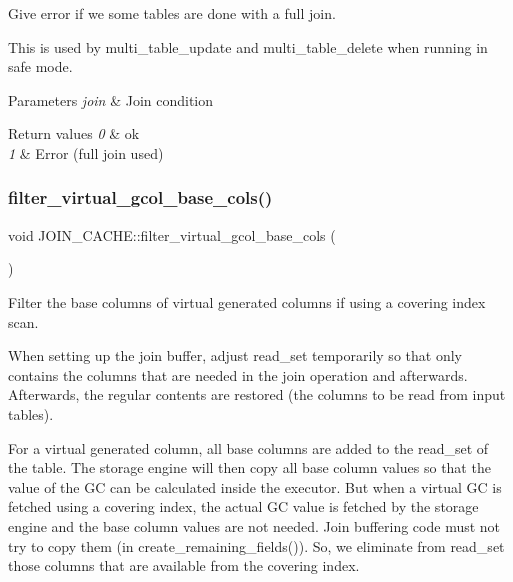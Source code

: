 Give error if we some tables are done with a full join.

This is used by multi\+\_\+table\+\_\+update and multi\+\_\+table\+\_\+delete when running in safe mode.


\begin{DoxyParams}{Parameters}
{\em join} & Join condition\\
\hline
\end{DoxyParams}

\begin{DoxyRetVals}{Return values}
{\em 0} & ok \\
\hline
{\em 1} & Error (full join used) \\
\hline
\end{DoxyRetVals}
\mbox{\label{group__Query__Optimizer_gaae89dde6a1925032ade263c27a87529f}} 
\subsubsection{\texorpdfstring{filter\+\_\+virtual\+\_\+gcol\+\_\+base\+\_\+cols()}{filter\_virtual\_gcol\_base\_cols()}}
{\footnotesize\ttfamily void J\+O\+I\+N\+\_\+\+C\+A\+C\+H\+E\+::filter\+\_\+virtual\+\_\+gcol\+\_\+base\+\_\+cols (\begin{DoxyParamCaption}{ }\end{DoxyParamCaption})\hspace{0.3cm}{\ttfamily [protected]}}

Filter the base columns of virtual generated columns if using a covering index scan.

When setting up the join buffer, adjust read\+\_\+set temporarily so that only contains the columns that are needed in the join operation and afterwards. Afterwards, the regular contents are restored (the columns to be read from input tables).

For a virtual generated column, all base columns are added to the read\+\_\+set of the table. The storage engine will then copy all base column values so that the value of the GC can be calculated inside the executor. But when a virtual GC is fetched using a covering index, the actual GC value is fetched by the storage engine and the base column values are not needed. Join buffering code must not try to copy them (in create\+\_\+remaining\+\_\+fields()). So, we eliminate from read\+\_\+set those columns that are available from the covering index.


